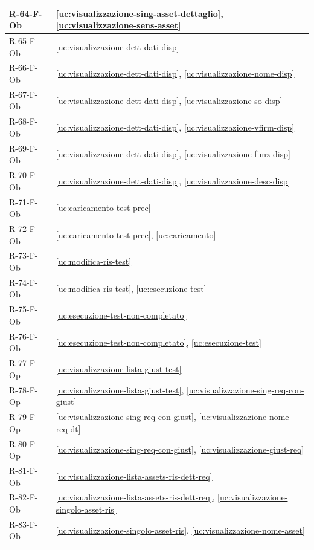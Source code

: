 ﻿\documentclass[a4paper,12pt]{article}
\begin{document}
{\begin{longtable}{|
      >{\centering\arraybackslash}p{}|
      >{\centering\arraybackslash}p{}|
      }
        R-64-F-Ob & \ref{uc:visualizzazione-sing-asset-dettaglio}, \ref{uc:visualizzazione-sens-asset} \\ \hline
        R-65-F-Ob & \ref{uc:visualizzazione-dett-dati-disp} \\ \hline
        R-66-F-Ob & \ref{uc:visualizzazione-dett-dati-disp}, \ref{uc:visualizzazione-nome-disp} \\ \hline
        R-67-F-Ob & \ref{uc:visualizzazione-dett-dati-disp}, \ref{uc:visualizzazione-so-disp} \\ \hline
        R-68-F-Ob & \ref{uc:visualizzazione-dett-dati-disp}, \ref{uc:visualizzazione-vfirm-disp} \\ \hline
        R-69-F-Ob & \ref{uc:visualizzazione-dett-dati-disp}, \ref{uc:visualizzazione-funz-disp} \\ \hline
        R-70-F-Ob & \ref{uc:visualizzazione-dett-dati-disp}, \ref{uc:visualizzazione-desc-disp} \\ \hline
        R-71-F-Ob & \ref{uc:caricamento-test-prec} \\ \hline
        R-72-F-Ob & \ref{uc:caricamento-test-prec}, \ref{uc:caricamento} \\ \hline
        R-73-F-Ob & \ref{uc:modifica-ris-test} \\ \hline
        R-74-F-Ob & \ref{uc:modifica-ris-test}, \ref{uc:esecuzione-test} \\ \hline
        R-75-F-Ob & \ref{uc:esecuzione-test-non-completato} \\ \hline
        R-76-F-Ob & \ref{uc:esecuzione-test-non-completato}, \ref{uc:esecuzione-test} \\ \hline
        R-77-F-Op & \ref{uc:visualizzazione-lista-giust-test} \\ \hline
        R-78-F-Op & \ref{uc:visualizzazione-lista-giust-test}, \ref{uc:visualizzazione-sing-req-con-giust} \\ \hline
        R-79-F-Op & \ref{uc:visualizzazione-sing-req-con-giust}, \ref{uc:visualizzazione-nome-req-dt} \\ \hline
        R-80-F-Op & \ref{uc:visualizzazione-sing-req-con-giust}, \ref{uc:visualizzazione-giust-req} \\ \hline
        R-81-F-Ob & \ref{uc:visualizzazione-lista-assets-ris-dett-req} \\ \hline
        R-82-F-Ob & \ref{uc:visualizzazione-lista-assets-ris-dett-req}, \ref{uc:visualizzazione-singolo-asset-ris} \\ \hline
        R-83-F-Ob & \ref{uc:visualizzazione-singolo-asset-ris}, \ref{uc:visualizzazione-nome-asset} \\ \hline

\end{longtable}}
\end{document}
